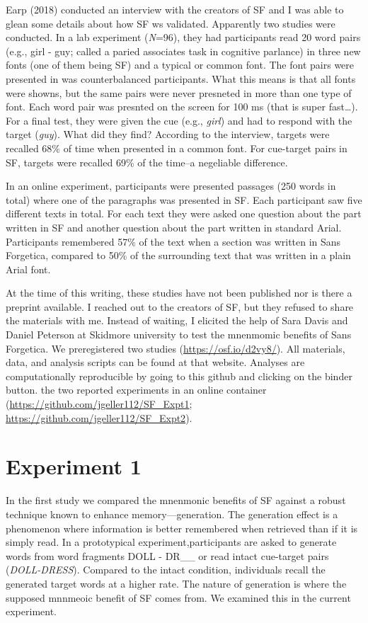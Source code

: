 \documentclass[doc]{apa6}
\begin{document}
Earp (2018) conducted an interview with the creators of SF and I was able to glean some details about how SF ws validated. Apparently two studies were conducted. In a lab experiment (\emph{N}=96), they had participants read 20 word pairs (e.g., girl - guy; called a paried associates task in cognitive parlance) in three new fonts (one of them being SF) and a typical or common font. The font pairs were presented in was counterbalanced participants. What this means is that all fonts were showns, but the same pairs were never presneted in more than one type of font. Each word pair was presnted on the screen for 100 ms (that is super fast\ldots{}). For a final test, they were given the cue (e.g., \emph{girl}) and had to respond with the target (\emph{guy}). What did they find? According to the interview, targets were recalled 68\% of time when presented in a common font. For cue-target pairs in SF, targets were recalled 69\% of the time--a negeliable difference.

In an online experiment, participants were presented passages (250 words in total) where one of the paragraphs was presented in SF. Each participant saw five different texts in total. For each text they were asked one question about the part written in SF and another question about the part written in standard Arial. Participants remembered 57\% of the text when a section was written in Sans Forgetica, compared to 50\% of the surrounding text that was written in a plain Arial font.

At the time of this writing, these studies have not been published nor is there a preprint available. I reached out to the creators of SF, but they refused to share the materials with me. Instead of waiting, I elicited the help of Sara Davis and Daniel Peterson at Skidmore university to test the mnenmomic benefits of Sans Forgetica. We preregistered two studies (\url{https://osf.io/d2vy8/}). All materials, data, and analysis scripts can be found at that website. Analyses are computationally reproducible by going to this github and clicking on the binder button. the two reported experiments in an online container (\url{https://github.com/jgeller112/SF_Expt1}; \url{https://github.com/jgeller112/SF_Expt2}).

\hypertarget{experiment-1}{%
\section{Experiment 1}\label{experiment-1}}

In the first study we compared the mnenmonic benefits of SF against a robust technique known to enhance memory---generation. The generation effect is a phenomenon where information is better remembered when retrieved than if it is simply read. In a prototypical experiment,participants are asked to generate words from word fragments DOLL - DR\_\_ or read intact cue-target pairs (\emph{DOLL-DRESS}). Compared to the intact condition, individuals recall the generated target words at a higher rate. The nature of generation is where the supposed mnnmeoic benefit of SF comes from. We examined this in the current experiment.
\end{document}
